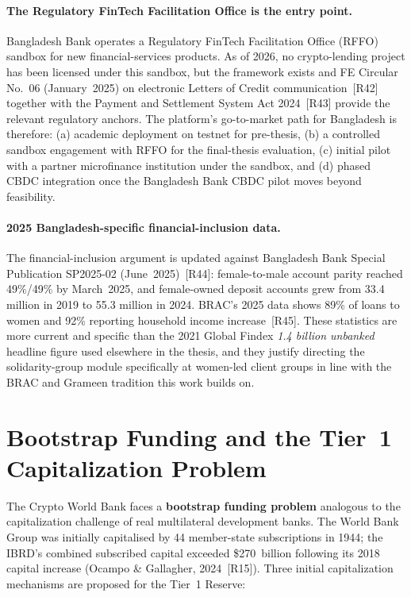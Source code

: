 \documentclass[12pt,a4paper]{report}
\begin{document}
\paragraph{The Regulatory FinTech Facilitation Office is the entry point.}
Bangladesh Bank operates a Regulatory FinTech Facilitation Office (RFFO) sandbox for new financial-services products. As of 2026, no crypto-lending project has been licensed under this sandbox, but the framework exists and FE Circular No.~06 (January~2025) on electronic Letters of Credit communication~[R42] together with the Payment and Settlement System Act 2024~[R43] provide the relevant regulatory anchors. The platform's go-to-market path for Bangladesh is therefore: (a) academic deployment on testnet for pre-thesis, (b) a controlled sandbox engagement with RFFO for the final-thesis evaluation, (c) initial pilot with a partner microfinance institution under the sandbox, and (d) phased CBDC integration once the Bangladesh Bank CBDC pilot moves beyond feasibility.

\paragraph{2025 Bangladesh-specific financial-inclusion data.}
The financial-inclusion argument is updated against Bangladesh Bank Special Publication SP2025-02 (June~2025)~[R44]: female-to-male account parity reached 49\%/49\% by March~2025, and female-owned deposit accounts grew from 33.4 million in 2019 to 55.3 million in 2024. BRAC's 2025 data shows 89\% of loans to women and 92\% reporting household income increase~[R45]. These statistics are more current and specific than the 2021 Global Findex \emph{1.4 billion unbanked} headline figure used elsewhere in the thesis, and they justify directing the solidarity-group module specifically at women-led client groups in line with the BRAC and Grameen tradition this work builds on.

\section{Bootstrap Funding and the Tier~1 Capitalization Problem}

The Crypto World Bank faces a \textbf{bootstrap funding problem} analogous to the capitalization challenge of real multilateral development banks. The World Bank Group was initially capitalised by 44 member-state subscriptions in 1944; the IBRD's combined subscribed capital exceeded \$270~billion following its 2018 capital increase (Ocampo \& Gallagher, 2024~[R15]). Three initial capitalization mechanisms are proposed for the Tier~1 Reserve:
\end{document}
